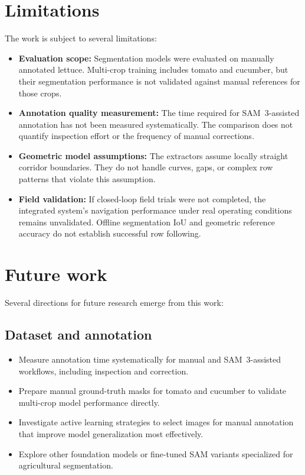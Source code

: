 \section{Limitations}
\label{sec:limitations}

The work is subject to several limitations:

\begin{itemize}
\item \textbf{Evaluation scope:} Segmentation models were evaluated on manually annotated lettuce. Multi-crop training includes tomato and cucumber, but their segmentation performance is not validated against manual references for those crops.

\item \textbf{Annotation quality measurement:} The time required for SAM~3-assisted annotation has not been measured systematically. The comparison does not quantify inspection effort or the frequency of manual corrections.

\item \textbf{Geometric model assumptions:} The extractors assume locally straight corridor boundaries. They do not handle curves, gaps, or complex row patterns that violate this assumption.

\item \textbf{Field validation:} If closed-loop field trials were not completed, the integrated system's navigation performance under real operating conditions remains unvalidated. Offline segmentation IoU and geometric reference accuracy do not establish successful row following.
\end{itemize}

\section{Future work}
\label{sec:future_work}

Several directions for future research emerge from this work:

\subsection{Dataset and annotation}
\label{subsec:future_annotation}

\begin{itemize}
\item Measure annotation time systematically for manual and SAM~3-assisted workflows, including inspection and correction.
\item Prepare manual ground-truth masks for tomato and cucumber to validate multi-crop model performance directly.
\item Investigate active learning strategies to select images for manual annotation that improve model generalization most effectively.
\item Explore other foundation models or fine-tuned SAM variants specialized for agricultural segmentation.
\end{itemize}

